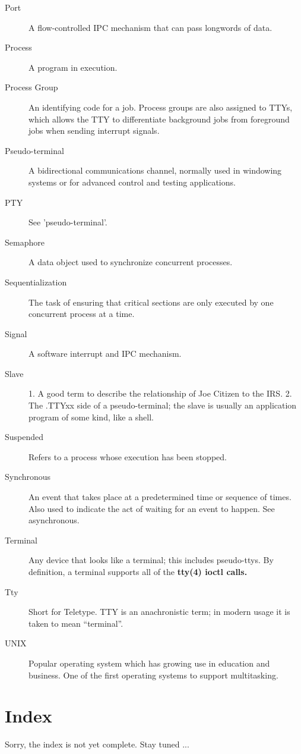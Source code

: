 \documentclass{report}
\begin{document}
\begin{description}
\item[Port]
	A flow-controlled IPC mechanism that can pass longwords of data.
\item[Process]
	A program in execution.
\item[Process Group]
	An identifying code for a job. Process groups are also assigned
	to TTYs, which allows the TTY to differentiate  
	background jobs	from foreground jobs when sending interrupt signals.
\item[Pseudo-terminal]
	A bidirectional communications channel, normally used in windowing
	systems or for advanced control and testing applications.
\item[PTY]
	See 'pseudo-terminal'.
\item[Semaphore]
	A data object used to synchronize concurrent processes.
\item[Sequentialization]
	The task of ensuring that critical sections are only executed by one
	concurrent process at a time.
\item[Signal]
	A software interrupt and IPC mechanism.
\item[Slave]
	1. A good term to describe the relationship of Joe Citizen to the IRS.
	2. The  .TTYxx side of a pseudo-terminal; the slave
	is usually an application program of some kind, like a shell.
\item[Suspended]
	Refers to a process whose execution has been stopped.
\item[Synchronous]
	An event that takes place at a predetermined time or sequence of times.
	Also used to indicate the act of waiting for an event to happen. See
	asynchronous.
\item[Terminal]
	Any device that looks like a terminal; this includes pseudo-ttys. By
	definition, a terminal supports all of the \bf tty\rm(4)
	ioctl calls.
\item[Tty]
	Short for Teletype. TTY is an anachronistic term; in modern usage
	it is taken to mean ``terminal''.
\item[UNIX]
	Popular operating system which has growing use in education and
	business.  One of the first operating systems to support multitasking.
\end{description}

\begin{comment}
\printindex
\end{comment}

\chapter{Index}

Sorry, the index is not yet complete.  Stay tuned ...
\end{document}
